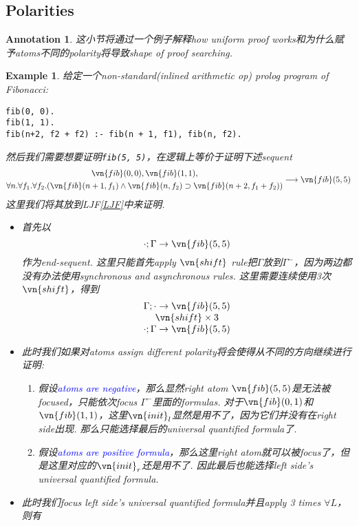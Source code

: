 \documentclass{article}
\theoremstyle{plain}
\newtheorem{example}[theorem]{Example}
\newtheorem{annotation}[theorem]{Annotation}
\theoremstyle{nonumberplain}
\newcommand{\bluet}[1]{\textcolor{blue}{#1}}
\begin{document}
\newpage
\subsection{Polarities}

\begin{annotation}
\rm 这小节将通过一个例子解释how uniform proof works和为什么赋予atoms不同的polarity将导致shape of proof searching.
\end{annotation}

\begin{example}
\rm 给定一个non-standard(inlined arithmetic op) prolog program of Fibonacci:
\begin{lstlisting}[basicstyle={\normalsize\ttfamily}]
fib(0, 0).
fib(1, 1).
fib(n+2, f2 + f2) :- fib(n + 1, f1), fib(n, f2).
\end{lstlisting}
然后我们需要想要证明\texttt{fib(5, 5)}，在逻辑上等价于证明下述sequent
\[
\begin{gathered}
\vn{fib}(0,0), \vn{fib}(1,1), \\
\forall n.\forall f_1.\forall f_2.(\vn{fib}(n+1,f_1) \wedge \vn{fib}(n,f_2) \supset \vn{fib}(n+2,f_1+f_2)) 
\end{gathered}
\longrightarrow \vn{fib}(5,5)
\]
这里我们将其放到LJF\ref{LJF}中来证明. 
\begin{itemize}
	\item 首先以
	\[
		\cdot;\Gamma \to \vn{fib}(5,5)
	\]
	作为end-sequent. 这里只能首先apply $\vn{shift}$ rule把$\Gamma$放到$\Gamma^-$，因为两边都没有办法使用synchronous and asynchronous rules. 这里需要连续使用3次$\vn{shift}$，得到
	\[
		\deduce{\cdot;\Gamma \to \vn{fib}(5,5)}{\deduce{\vn{shift} \times 3}{\Gamma;\cdot \to \vn{fib}(5,5)}}
	\]
	\item 此时我们如果对atoms assign different polarity将会使得从不同的方向继续进行证明:
	\begin{enumerate}
		\item 假设\bluet{atoms are negative}，那么显然right atom $\vn{fib}(5,5)$是无法被focused，只能依次focus $\Gamma^-$里面的formulas. 对于$\vn{fib}(0,1)$和$\vn{fib}(1,1)$，这里$\vn{init}_l$显然是用不了，因为它们并没有在right side出现. 那么只能选择最后的universal quantified formula了.
		\item 假设\bluet{atoms are positive formula}，那么这里right atom就可以被focus了，但是这里对应的$\vn{init}_r$还是用不了. 因此最后也能选择left side's universal quantified formula. 
	\end{enumerate}
	\item 此时我们focus left side's universal quantified formula并且apply 3 times $\forall L$，则有

\end{itemize}
\end{example}
\end{document}
